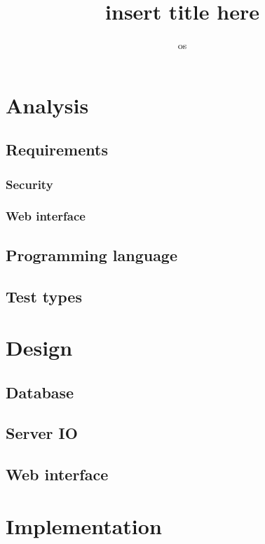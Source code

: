 

\title{insert title here}
\author{os}


\maketitle
\tableofcontents



\chapter{Analysis}
  \section{Requirements}
    \subsection{Security}
    \subsection{Web interface}
    \section{Programming language}
    
  \section{Test types}

\chapter{Design}
  \section{Database}
  \section{Server IO}
  \section{Web interface}

\chapter{Implementation}
